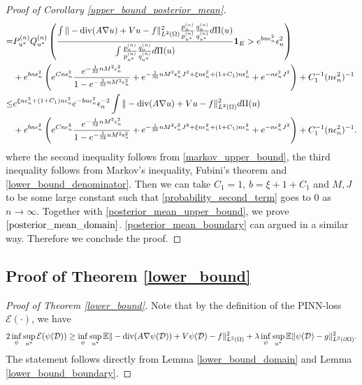 \documentclass{article}
\newcommand{\E}{\mathbb{E}}
\newcommand{\D}{\mathcal{D}}
\renewcommand{\div}{\textnormal{div}}
\theoremstyle{plain}
\theoremstyle{definition}
\theoremstyle{remark}
\begin{document}
\begin{proof}[Proof of Corollary \ref{upper_bound_posterior_mean}]
\begin{equation}
\begin{aligned}
        = &  P_{u^*}^{(n)} Q_{u^*}^{(n)} \left( \frac{\int \|-\div(A \nabla u) + V u -f\|_{L^2(\Omega)}^2 \frac{p_{u}^{(n)}}{p_{u^*}^{(n)}} \frac{q_{u}^{(n)}}{q_{u^*}^{(n)}} d \Pi(u)}{\int \frac{p_{u}^{(n)}}{p_{u^*}^{(n)}} \frac{q_{u}^{(n)}}{q_{u^*}^{(n)}} d \Pi(u)} \mathbf{1}_E > e^{b n \epsilon_n^2} \epsilon_n^2 \right) \\
        & + e^{b n\epsilon_n^2} \left(e^{C n \epsilon_n^2} \frac{e^{-\frac{1}{32}n M^2 \epsilon_n^2}}{1 - e^{-\frac{1}{32}n M^2 \epsilon_n^2}} + e^{-\frac{1}{36} n M^2 \epsilon_{n}^2 J^2 + \xi n\epsilon_n^2 + (1+C_1) n \epsilon_n^2} + e^{-  n\epsilon_n^2 J^2}\right) + C_1^{-1} (n \epsilon_n^2)^{-1} \\
        \leq & e^{\xi n\epsilon_n^2 + (1+C_1) n \epsilon_n^2} e^{-b n\epsilon_n^2} \epsilon_n^{-2} \int \|-\div(A \nabla u) + V u -f\|_{L^2(\Omega)}^2 d \Pi(u) \\
        & + e^{b n\epsilon_n^2} \left(e^{C n \epsilon_n^2} \frac{e^{-\frac{1}{32}n M^2 \epsilon_n^2}}{1 - e^{-\frac{1}{32}n M^2 \epsilon_n^2}} + e^{-\frac{1}{36} n M^2 \epsilon_{n}^2 J^2 + \xi n\epsilon_n^2 + (1+C_1) n \epsilon_n^2} + e^{-  n\epsilon_n^2 J^2}\right) + C_1^{-1} (n \epsilon_n^2)^{-1}. 
    \end{aligned}
\end{equation}
where the second inequality follows from \eqref{markov_upper_bound}, the third inequality follows from Markov's inequality, Fubini's theorem and \eqref{lower_bound_denominator}. Then we can take $C_1 = 1$, $b = \xi + 1 + C_1$ and $M, J$ to be some large constant such that  \eqref{probability_second_term} goes to $0$ as $n \to \infty$. Together with \eqref{posterior_mean_upper_bound}, we prove $\eqref{posterior_mean_domain}$. \eqref{posterior_mean_boundary} can argued in a similar way. Therefore we conclude the proof. 
\end{proof}

\subsection{Proof of Theorem \ref{lower_bound}} \label{proof_lower_bound}

\begin{proof}[Proof of Theorem \ref{lower_bound}]
    Note that by the definition of the PINN-loss $\mathcal{E}(\cdot)$, we have 
    \begin{align*}
    2 \inf_\psi \sup_{u^*} \mathcal{E}(\psi(\D))  
    \geq \inf_\psi \sup_{u^*} \E \|-\div(A \nabla \psi(\D)) + V \psi(\D) - f\|_{L^2(\Omega)}^2  + \lambda \inf_\psi \sup_{u^*} \E
    \|\psi(\D) - g\|_{L^2(\partial \Omega)}^2. 
\end{align*}
The statement follows directly from Lemma \ref{lower_bound_domain} and Lemma \ref{lower_bound_boundary}. 
\end{proof}
\end{document}
